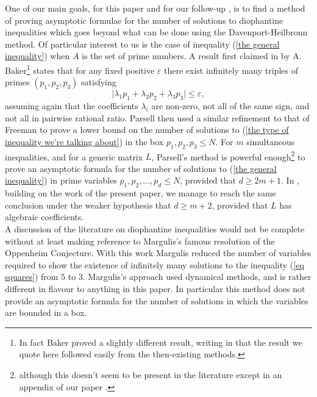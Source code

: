 \documentclass[12pt,a4paper,twoside,reqno]{amsart}
\numberwithin{equation}{section}
\begin{document}
One of our main goals, for this paper and for our follow-up \cite{Wa19}, is to find a method of proving asymptotic formulae for the number of solutions to diophantine inequalities which goes beyond what can be done using the Davenport-Heilbronn method. Of particular interest to us is the case of inequality (\ref{the general inequality}) when $A$ is the set of prime numbers. A result first claimed in \cite{Ba67} by A. Baker\footnote{In fact Baker proved a slightly different result, writing in \cite{Ba67} that the result we quote here followed easily from the then-existing methods.} states that for any fixed positive $\varepsilon$ there exist infinitely many triples of primes $(p_1,p_2,p_3)$ satisfying 
\begin{equation}
\label{the type of inequality we're talking about}
\vert \lambda_1p_1 + \lambda_2p_2 + \lambda_3 p_3\vert \leqslant \varepsilon,
\end{equation}
\noindent assuming again that the coefficients $\lambda_i$ are non-zero, not all of the same sign, and not all in pairwise rational ratio. Parsell \cite{Pa02} then used a similar refinement to that of Freeman to prove a lower bound on the number of solutions to (\ref{the type of inequality we're talking about}) in the box $p_1,p_2,p_3\leqslant N$. For $m$ simultaneous inequalities, and for a generic matrix $L$, Parsell's method is powerful enough\footnote{although this doesn't seem to be present in the literature except in an appendix of our paper \cite{Wa19}.}  to prove an asymptotic formula for the number of solutions to (\ref{the general inequality}) in prime variables $p_1,p_2,\dots,p_d \leqslant N$, provided that $d\geqslant 2m+1$. In \cite{Wa19}, building on the work of the present paper, we manage to reach the same conclusion under the weaker hypothesis that $d\geqslant m+2$, provided that $L$ has algebraic coefficients. \\

A discussion of the literature on diophantine inequalities would not be complete without at least making reference to Margulis's famous resolution \cite{Ma87} of the Oppenheim Conjecture. With this work Margulis reduced the number of variables required to show the existence of infinitely many solutions to the inequality (\ref{eq squares}) from $5$ to $3$. Margulis's approach used dynamical methods, and is rather different in flavour to anything in this paper. In particular this method does not provide an asymptotic formula for the number of solutions in which the variables are bounded in a box. \\
\end{document}
